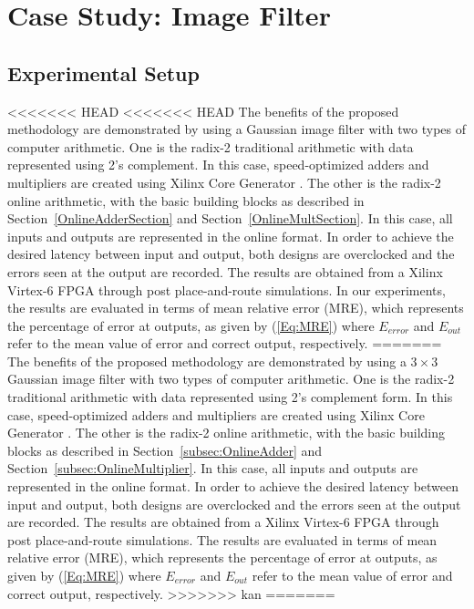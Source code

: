 \documentclass{acm_proc_article-sp}
\begin{document}
\section{Case Study: Image Filter}\label{Sec:CaseStudy}
\subsection{Experimental Setup}
<<<<<<< HEAD
<<<<<<< HEAD
The benefits of the proposed methodology are demonstrated by using a Gaussian image filter with two types of computer arithmetic. One is the radix-2 traditional arithmetic with data represented using 2's complement. In this case, speed-optimized adders and multipliers are created using Xilinx Core Generator \cite{Virtex6}. The other is the radix-2 online arithmetic, with the basic building blocks as described in Section~\ref{OnlineAdderSection} and Section~\ref{OnlineMultSection}. In this case, all inputs and outputs are represented in the online format. In order to achieve the desired latency between input and output, both designs are overclocked and the errors seen at the output are recorded. The results are obtained from a Xilinx Virtex-6 FPGA through post place-and-route simulations. In our experiments, the results are evaluated in terms of mean relative error (MRE), which represents the percentage of error at outputs, as given by (\ref{Eq:MRE}) where $E_{error}$ and $E_{out}$ refer to the mean value of error and correct output, respectively.
=======
The benefits of the proposed methodology are demonstrated by using a $3\times3$ Gaussian image filter with two types of computer arithmetic. One is the radix-2 traditional arithmetic with data represented using 2's complement form. In this case, speed-optimized adders and multipliers are created using Xilinx Core Generator \cite{XilinxMult}. The other is the radix-2 online arithmetic, with the basic building blocks as described in Section~\ref{subsec:OnlineAdder} and Section~\ref{subsec:OnlineMultiplier}. In this case, all inputs and outputs are represented in the online format. In order to achieve the desired latency between input and output, both designs are overclocked and the errors seen at the output are recorded. The results are obtained from a Xilinx Virtex-6 FPGA through post place-and-route simulations. The results are evaluated in terms of mean relative error (MRE), which represents the percentage of error at outputs, as given by (\ref{Eq:MRE}) where $E_{error}$ and $E_{out}$ refer to the mean value of error and correct output, respectively.
>>>>>>> kan
=======
\end{document}
